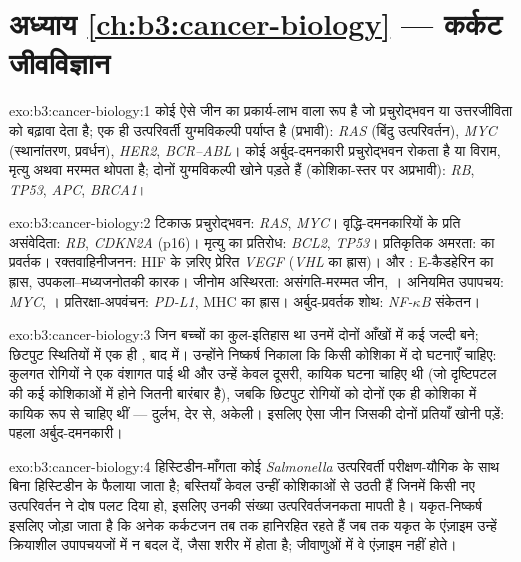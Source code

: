 \section*{अध्याय \ref{ch:b3:cancer-biology} --- कर्कट जीवविज्ञान}

\begin{solution}{exo:b3:cancer-biology:1}
कोई  ऐसे जीन का प्रकार्य-लाभ वाला रूप है जो प्रचुरोद्भवन या
उत्तरजीविता को बढ़ावा देता है; एक ही उत्परिवर्ती युग्मविकल्पी पर्याप्त
है (प्रभावी): \emph{RAS} (बिंदु उत्परिवर्तन), \emph{MYC} (स्थानांतरण,
प्रवर्धन), \emph{HER2}, \emph{BCR--ABL}। कोई अर्बुद-दमनकारी
प्रचुरोद्भवन रोकता है या विराम, मृत्यु अथवा मरम्मत थोपता है; दोनों
युग्मविकल्पी खोने पड़ते हैं (कोशिका-स्तर पर अप्रभावी): \emph{RB},
\emph{TP53}, \emph{APC}, \emph{BRCA1}।
\end{solution}

\begin{solution}{exo:b3:cancer-biology:2}
टिकाऊ प्रचुरोद्भवन: \emph{RAS}, \emph{MYC}। वृद्धि-दमनकारियों के प्रति
असंवेदिता: \emph{RB}, \emph{CDKN2A} (p16)। मृत्यु का प्रतिरोध:
\emph{BCL2}, \emph{TP53}। प्रतिकृतिक अमरता:  का
प्रवर्तक। रक्तवाहिनीजनन: HIF के ज़रिए प्रेरित \emph{VEGF} (\emph{VHL}
का ह्रास)।  और : E-कैडहेरिन का ह्रास,
उपकला--मध्यजनोतकी कारक। जीनोम अस्थिरता: असंगति-मरम्मत
जीन, \emph{}। अनियमित उपापचय: \emph{MYC}, ।
प्रतिरक्षा-अपवंचन: \emph{PD-L1}, MHC का ह्रास। अर्बुद-प्रवर्तक शोथ:
\emph{NF-$\kappa$B} संकेतन।
\end{solution}

\begin{solution}{exo:b3:cancer-biology:3}
जिन बच्चों का कुल-इतिहास था उनमें दोनों आँखों में कई  जल्दी बने;
छिटपुट स्थितियों में एक ही , बाद में। उन्होंने निष्कर्ष निकाला कि
किसी कोशिका में दो घटनाएँ चाहिए: कुलगत रोगियों ने एक वंशागत पाई थी और
उन्हें केवल दूसरी, कायिक घटना चाहिए थी (जो दृष्टिपटल की कई कोशिकाओं में
होने जितनी बारंबार है), जबकि छिटपुट रोगियों को दोनों एक ही कोशिका में
कायिक रूप से चाहिए थीं --- दुर्लभ, देर से, अकेली। इसलिए ऐसा जीन जिसकी
दोनों प्रतियाँ खोनी पड़ें: पहला अर्बुद-दमनकारी।
\end{solution}

\begin{solution}{exo:b3:cancer-biology:4}
हिस्टिडीन-माँगता कोई \emph{Salmonella} उत्परिवर्ती परीक्षण-यौगिक के साथ
बिना हिस्टिडीन के फैलाया जाता है; बस्तियाँ केवल उन्हीं कोशिकाओं से उठती
हैं जिनमें किसी नए उत्परिवर्तन ने दोष पलट दिया हो, इसलिए उनकी संख्या
उत्परिवर्तजनकता मापती है। यकृत-निष्कर्ष इसलिए जोड़ा जाता है कि अनेक
कर्कटजन तब तक हानिरहित रहते हैं जब तक यकृत के एंज़ाइम उन्हें क्रियाशील
उपापचयजों में न बदल दें, जैसा शरीर में होता है; जीवाणुओं में वे एंज़ाइम
नहीं होते।
\end{solution}

